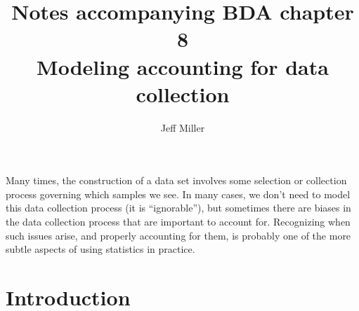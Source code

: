 \documentclass[12pt]{article}
\title{Notes accompanying BDA chapter 8\\
\large Modeling accounting for data collection
}
\author{Jeff Miller}
\begin{document}
\maketitle

\tableofcontents

\vspace{2em}

Many times, the construction of a data set involves some selection or collection process governing which samples we see. In many cases, we don't need to model this data collection process (it is ``ignorable''), but sometimes there are biases in the data collection process that are important to account for. Recognizing when such issues arise, and properly accounting for them, is probably one of the more subtle aspects of using statistics  in practice.

\section{Introduction}
\end{document}

